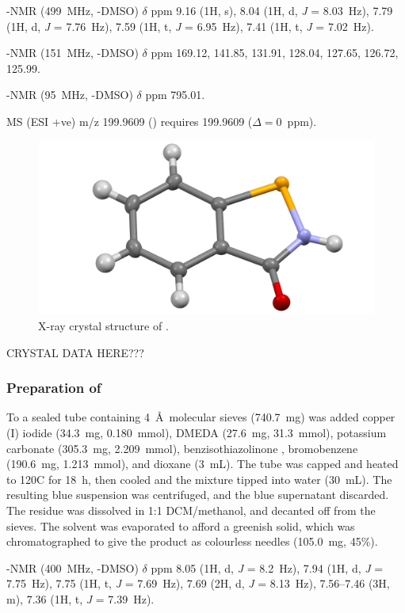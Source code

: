 \begin{refsection}
-NMR (499~MHz, -DMSO) $\delta$ ppm 9.16 (1H, s), 8.04 (1H, d, \textit{J} = 8.03~Hz), 7.79 (1H, d, \textit{J} = 7.76~Hz), 7.59 (1H, t, \textit{J} = 6.95~Hz), 7.41 (1H, t, \textit{J} = 7.02~Hz).

-NMR (151~MHz, -DMSO) $\delta$ ppm 169.12, 141.85, 131.91, 128.04, 127.65, 126.72, 125.99.

-NMR (95~MHz, -DMSO) $\delta$ ppm 795.01.

MS (ESI +ve) m/z 199.9609 ()  requires 199.9609 ($\Delta=0$~ppm).

\begin{figure}
    \includegraphics[width=0.8\linewidth]{Figures/ebs-h-xtal.pdf}
    \caption{X-ray crystal structure of .}
\end{figure}

CRYSTAL DATA HERE???

\subsubsection{Preparation of }
To a sealed tube containing 4~\AA\ molecular sieves (740.7~mg) was added copper (I) iodide (34.3~mg, 0.180~mmol), DMEDA (27.6~mg, 31.3~mmol), potassium carbonate (305.3~mg, 2.209~mmol), benzisothiazolinone , bromobenzene (190.6~mg, 1.213~mmol), and dioxane (3~mL).
The tube was capped and heated to 120\degree{}C for 18~h, then cooled and the mixture tipped into water (30~mL). The resulting blue suspension was centrifuged, and the blue supernatant discarded. The residue was dissolved in 1:1 DCM/methanol, and decanted off from the sieves.
The solvent was evaporated to afford a greenish solid, which was chromatographed to give the product as colourless needles (105.0~mg, 45\%).

-NMR (400~MHz, -DMSO) $\delta$ ppm 8.05 (1H, d, \emph{J} = 8.2~Hz), 7.94 (1H, d, \emph{J} = 7.75~Hz), 7.75 (1H, t, \emph{J} = 7.69~Hz), 7.69 (2H, d, \emph{J} = 8.13~Hz), 7.56--7.46 (3H, m), 7.36 (1H, t, \emph{J} = 7.39~Hz).


\end{refsection}
